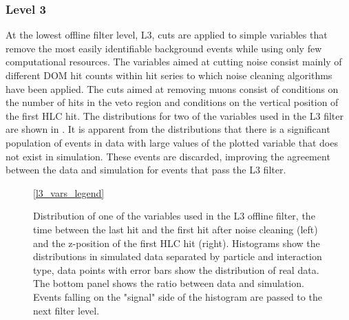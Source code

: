 \subsubsection{Level 3}
At the lowest offline filter level, L3, cuts are applied to simple variables that remove the most easily identifiable background events while using only few computational resources. The variables aimed at cutting noise consist mainly of different DOM hit counts within hit series to which noise cleaning algorithms have been applied. The cuts aimed at removing muons consist of conditions on the number of hits in the veto region and conditions on the vertical position of the first HLC hit. The distributions for two of the variables used in the L3 filter are shown in . It is apparent from the distributions that there is a significant population of events in data with large values of the plotted variable that does not exist in simulation. These events are discarded, improving the agreement between the data and simulation for events that pass the L3 filter.
%     
%     

\begin{figure}
    \centering
    \ref{l3_vars_legend}\par
    
    
    
    \caption{Distribution of one of the variables used in the L3 offline filter, the time between the last hit and the first hit after noise cleaning (left) and the z-position of the first HLC hit (right). Histograms show the distributions in simulated data separated by particle and interaction type, data points with error bars show the distribution of real data. The bottom panel shows the ratio between data and simulation. Events falling on the "signal" side of the histogram are passed to the next filter level.}
    \label{fig:l3-cut-vars}
\end{figure}


